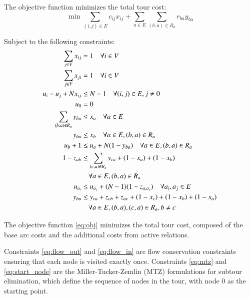 \documentclass[twocolumn, switch]{article} %
\begin{document}
\footnotesize

The objective function minimizes the total tour cost:
\begin{equation} \label{eq:obj}
\min \sum_{(i,j) \in E} c_{ij} x_{ij} + \sum_{a \in E} \sum_{(b,a) \in R_a} r_{ba} y_{ba}
\end{equation}

Subject to the following constraints:
\begin{subequations}
\begin{align}
    \sum_{j \in V} x_{ij} &= 1 \quad \forall i \in V \label{eq:flow_out} \\
    \sum_{j \in V} x_{ji} &= 1 \quad \forall i \in V \label{eq:flow_in} \\
    u_i - u_j + N x_{ij} &\leq N-1 \quad \forall (i,j) \in E, j \neq 0 \label{eq:mtz} \\
    u_0 &= 0 \label{eq:start_node} \\
    \sum_{(b,a) \in R_a} y_{ba} &\leq x_a \quad \forall a \in E \label{eq:rel_active_1} \\
    y_{ba} &\leq x_b \quad \forall a \in E, (b,a) \in R_a \label{eq:rel_active_2} \\
    u_b + 1 &\leq u_a + N(1-y_{ba}) \quad \forall a \in E, (b,a) \in R_a \label{eq:rel_precedence} \\
    1 - z_{ab} &\leq \sum_{(c,a) \in R_a} y_{ca} + (1 - x_a) + (1 - x_b) \notag \\
    &\quad \forall a \in E, (b,a) \in R_a \label{eq:rel_active_3} \\
    u_{a_i} &\leq u_{a_j} + (N-1)(1-z_{a_ia_j}) \quad \forall a_i, a_j \in E \label{eq:z_precedence} \\
    y_{ba} &\leq y_{ca} + z_{cb} + z_{ac} + (1-x_c) + (1-x_b) + (1-x_a) \notag \\
    &\quad \forall a \in E, (b,a),(c,a) \in R_a, b \neq c \label{eq:rel_last_trigger}
\end{align}
\end{subequations}

\normalsize

The objective function \eqref{eq:obj} minimizes the total tour cost, composed of the base arc costs and the additional costs from active relations.

Constraints \eqref{eq:flow_out} and \eqref{eq:flow_in} are flow conservation constraints ensuring that each node is visited exactly once.
Constraints \eqref{eq:mtz} and \eqref{eq:start_node} are the Miller-Tucker-Zemlin (MTZ) formulations for subtour elimination, which define the sequence of nodes in the tour, with node 0 as the starting point.
\end{document}
